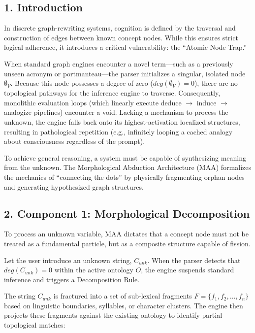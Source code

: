 \documentclass[
  11pt,
  a4paper,
]{article}
\begin{document}
\subsection{1. Introduction}\label{introduction}

In discrete graph-rewriting systems, cognition is defined by the
traversal and construction of edges between known concept nodes. While
this ensures strict logical adherence, it introduces a critical
vulnerability: the ``Atomic Node Trap.''

When standard graph engines encounter a novel term---such as a
previously unseen acronym or portmanteau---the parser initializes a
singular, isolated node \(\emptyset_V\). Because this node possesses a
degree of zero (\(deg(\emptyset_V) = 0\)), there are no topological
pathways for the inference engine to traverse. Consequently, monolithic
evaluation loops (which linearly execute deduce \(\rightarrow\) induce
\(\rightarrow\) analogize pipelines) encounter a void. Lacking a
mechanism to process the unknown, the engine falls back onto its
highest-activation localized structures, resulting in pathological
repetition (e.g., infinitely looping a cached analogy about
consciousness regardless of the prompt).

To achieve general reasoning, a system must be capable of synthesizing
meaning from the unknown. The Morphological Abduction Architecture (MAA)
formalizes the mechanics of ``connecting the dots'' by physically
fragmenting orphan nodes and generating hypothesized graph structures.

\subsection{2. Component 1: Morphological
Decomposition}\label{component-1-morphological-decomposition}

To process an unknown variable, MAA dictates that a concept node must
not be treated as a fundamental particle, but as a composite structure
capable of fission.

Let the user introduce an unknown string, \(C_{unk}\). When the parser
detects that \(deg(C_{unk}) = 0\) within the active ontology \(O\), the
engine suspends standard inference and triggers a Decomposition Rule.

The string \(C_{unk}\) is fractured into a set of sub-lexical fragments
\(F = \{f_1, f_2, \dots, f_n\}\) based on linguistic boundaries,
syllables, or character clusters. The engine then projects these
fragments against the existing ontology to identify partial topological
matches:
\end{document}
